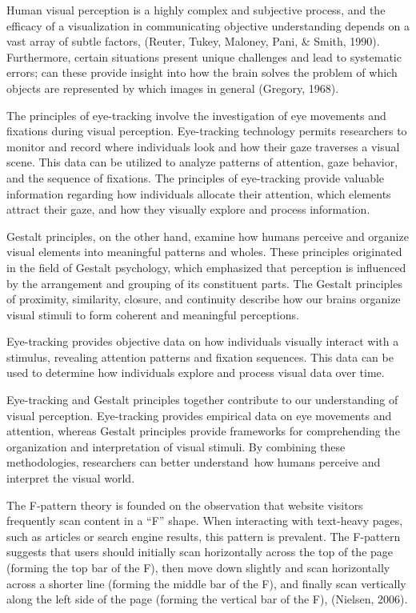 \documentclass[print]{nuthesis}
\begin{document}
Human visual perception is a highly complex and subjective process, and the efficacy of a visualization in communicating objective understanding depends on a vast array of subtle factors, (Reuter, Tukey, Maloney, Pani, \& Smith, 1990).
Furthermore, certain situations present unique challenges and lead to systematic errors; can these provide insight into how the brain solves the problem of which objects are represented by which images in general (Gregory, 1968).

The principles of eye-tracking involve the investigation of eye movements and fixations during visual perception.
Eye-tracking technology permits researchers to monitor and record where individuals look and how their gaze traverses a visual scene.
This data can be utilized to analyze patterns of attention, gaze behavior, and the sequence of fixations.
The principles of eye-tracking provide valuable information regarding how individuals allocate their attention, which elements attract their gaze, and how they visually explore and process information.

Gestalt principles, on the other hand, examine how humans perceive and organize visual elements into meaningful patterns and wholes.
These principles originated in the field of Gestalt psychology, which emphasized that perception is influenced by the arrangement and grouping of its constituent parts.
The Gestalt principles of proximity, similarity, closure, and continuity describe how our brains organize visual stimuli to form coherent and meaningful perceptions.

Eye-tracking provides objective data on how individuals visually interact with a stimulus, revealing attention patterns and fixation sequences.
This data can be used to determine how individuals explore and process visual data over time.

Eye-tracking and Gestalt principles together contribute to our understanding of visual perception.
Eye-tracking provides empirical data on eye movements and attention, whereas Gestalt principles provide frameworks for comprehending the organization and interpretation of visual stimuli.
By combining these methodologies, researchers can better understand~how humans perceive and interpret the visual world.

The F-pattern theory is founded on the observation that website visitors frequently scan content in a ``F'' shape.
When interacting with text-heavy pages, such as articles or search engine results, this pattern is prevalent.
The F-pattern suggests that users should initially scan horizontally across the top of the page (forming the top bar of the F), then move down slightly and scan horizontally across a shorter line (forming the middle bar of the F), and finally scan vertically along the left side of the page (forming the vertical bar of the F), (Nielsen, 2006).
\end{document}
